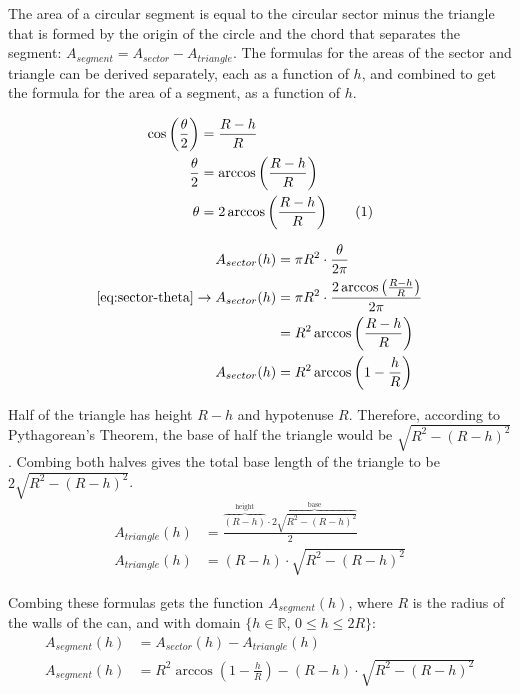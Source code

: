 \documentclass[11pt]{article}
\newcommand{\numberthis}{\addtocounter{equation}{1}\tag{\theequation}}
\begin{document}
    The area of a circular segment is equal to the circular sector minus the triangle that is formed by the origin of the circle and the chord that separates the segment: ${A_{segment} = A_{sector} - A_{triangle}}$. The formulas for the areas of the sector and triangle can be derived separately, each as a function of $h$, and combined to get the formula for the area of a segment, as a function of $h$.

    \begin{minipage}{.4\linewidth}
        {\footnotesize\begin{align*}
            \cos{\left( \frac{\theta}{2} \right)} &= \frac{R - h}{R} \\
            \frac{\theta}{2} &= \arccos{\left( \frac{R - h}{R} \right)} \\
            \theta &= 2 \arccos{\left( \frac{R - h}{R} \right)} \numberthis{\label{eq:sector-theta}}
        \end{align*}}
    \end{minipage}%
    \begin{minipage}{.6\linewidth}
        {\footnotesize\begin{align*}
            A_{sector}(h) &= \pi R^2 \cdot \frac{\theta}{2\pi} \\
            \eqref{eq:sector-theta} \rightarrow A_{sector}(h) &= \pi R^2 \cdot \frac{2 \arccos{\left( \frac{R - h}{R} \right)}}{2\pi} \\
            &= R^2 \arccos{\left( \frac{R - h}{R} \right)} \\
            A_{sector}(h) &= R^2 \arccos{\left( 1 - \frac{h}{R} \right)}
        \end{align*}}
    \end{minipage}
    \vspace{2pt}

    Half of the triangle has height $R - h$ and hypotenuse $R$. Therefore, according to Pythagorean's Theorem, the base of half the triangle would be $\sqrt{R^2 - (R - h)^2}$. Combing both halves gives the total base length of the triangle to be $2 \sqrt{R^2 - (R - h)^2}$.
    {\footnotesize\begin{align*}
        A_{triangle}(h) &= \frac{\overbrace{(R - h)}^{\text{height}} \cdot \overbrace{2 \sqrt{R^2 - (R - h)^2}}^{\text{base}}}{2} \\
        A_{triangle}(h) &= (R - h) \cdot \sqrt{R^2 - (R - h)^2}
    \end{align*}}

    Combing these formulas gets the function $A_{segment}(h)$, where $R$ is the radius of the walls of the can, and with domain $\{ h \in \mathbb{R}, \, 0 \le h \le 2R \}$:
    {\footnotesize\begin{align*}
        A_{segment}(h) &= A_{sector}(h) - A_{triangle}(h) \\
        A_{segment}(h) &= R^2 \arccos{\left( 1 - \frac{h}{R} \right)} - (R - h) \cdot \sqrt{R^2 - (R - h)^2}
    \end{align*}}
\end{document}
